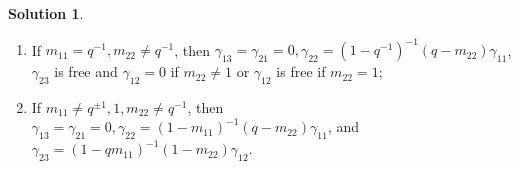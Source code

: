 \documentclass[a4paper,10pt]{amsart}
\theoremstyle{definition}
\newtheorem{solution}[theorem]{Solution}
\numberwithin{equation}{section}
\begin{document}
\begin{solution}
\begin{enumerate}
\item If $m_{11}=q^{-1},m_{22}\neq q^{-1}$, then $\gamma_{13}=\gamma_{21}=0,\gamma_{22}=(1-q^{-1})^{-1}(q-m_{22})\gamma_{11}$, $\gamma_{23}$ is free and $\gamma_{12}=0$ if $m_{22}\neq 1$ or $\gamma_{12}$ is free if $m_{22}=1$;%

%
\item  If $m_{11}\neq q^{\pm 1},1,m_{22}\neq q^{-1}$, then $\gamma_{13}=\gamma_{21}=0,\gamma_{22}=(1-m_{11})^{-1}(q-m_{22})\gamma_{11}$,  and $\gamma_{23}=(1-qm_{11})^{-1}(1-m_{22})\gamma_{12}$.%



\end{enumerate}
\end{solution}
\end{document}
